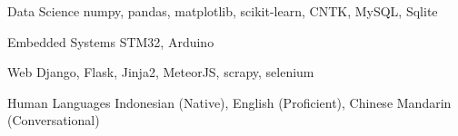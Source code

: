 

\begin{cvskills}



  \cvskill
    {Data Science} %
    {numpy, pandas, matplotlib, scikit-learn, CNTK, MySQL, Sqlite} %

  \cvskill
    {Embedded Systems} %
    {STM32, Arduino} %

  \cvskill
    {Web} %
    {Django, Flask, Jinja2, MeteorJS, scrapy, selenium} %

   \cvskill
    {Human Languages} %
    {Indonesian (Native), English (Proficient), Chinese Mandarin (Conversational)} %



\end{cvskills}

